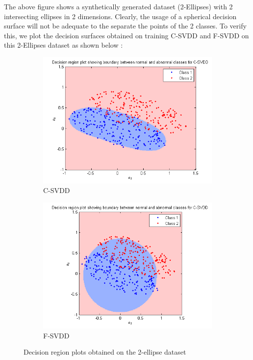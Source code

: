 \documentclass{article} %
\begin{document}
The above figure shows a synthetically generated dataset (2-Ellipses) with 2 intersecting ellipses in 2 dimensions.  Clearly, the usage of a spherical decision surface will not be adequate to the separate the points of the 2 classes. To verify this, we plot the decision surfaces obtained on training C-SVDD and F-SVDD on this 2-Ellipses dataset as shown below :

\begin{figure}
\begin{subfigure}{.5\textwidth}
  \centering
  \includegraphics[width=\linewidth]{Plots/Ellipse/svdd/decn}
\caption{C-SVDD} 
\end{subfigure}%
\begin{subfigure}{.5\textwidth}
  \centering
  \includegraphics[width=\linewidth]{Plots/Ellipse/fsvdd/decn}
\caption{F-SVDD}  
\end{subfigure}
\caption{Decision region plots obtained on the 2-ellipse dataset}
\end{figure}
\end{document}
